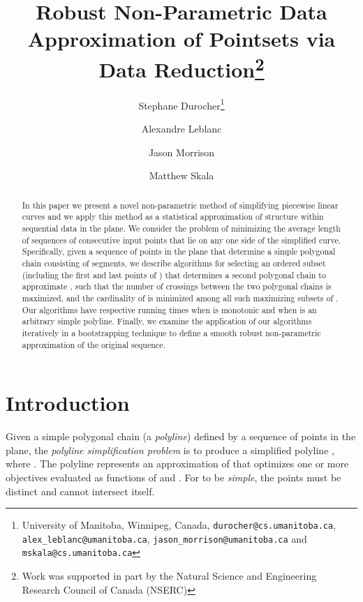 \documentclass{article}
\begin{document}
\title{Robust Non-Parametric Data Approximation of Pointsets via Data Reduction\thanks{Work was supported in part by the Natural Science and Engineering Research Council of Canada (NSERC)}}

\author{Stephane Durocher\thanks{University of Manitoba, Winnipeg, Canada, {\tt durocher@cs.umanitoba.ca}, {\tt alex\_{}leblanc@umanitoba.ca}, {\tt jason\_{}morrison@umanitoba.ca} and {\tt mskala@cs.umanitoba.ca}} \and Alexandre Leblanc\footnotemark[2] \and Jason Morrison\footnotemark[2] \and Matthew Skala\footnotemark[2]}



\maketitle

\begin{abstract}
In this paper we present a novel non-parametric method of simplifying
piecewise linear curves and we apply this method 
as a statistical approximation of structure within sequential data in the plane.
We consider the problem of minimizing the average length of sequences of
consecutive input points that lie on any one side of the simplified curve.
Specifically, given a sequence  of  points in the plane that determine a 
simple polygonal chain consisting of  segments, 
we describe algorithms for selecting an ordered subset 
(including the first and last points of ) that determines a second
polygonal chain to approximate ,
such that the number of crossings between the two polygonal chains is maximized,
and the cardinality of  is minimized among 
all such maximizing subsets of .
Our algorithms have respective running times 
 when  is monotonic and
 when  is an arbitrary simple polyline.
Finally, we examine the application of our algorithms iteratively in a 
bootstrapping technique to define a smooth robust non-parametric approximation of the original sequence.
\end{abstract}

\section{Introduction}

Given a simple
polygonal chain  (a \emph{polyline}) defined by a sequence of points
 in the plane, the \emph{polyline simplification problem} is
to produce a simplified polyline , where .
The polyline  represents an approximation of 
that optimizes one or more objectives evaluated as functions of  and .
For  to be \emph{simple}, the points  must be
distinct and  cannot intersect itself.
\end{document}
